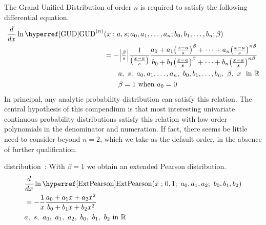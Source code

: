 

\label{sec:GUD}

The Grand Unified Distribution of order $n$ is required to satisfy the following differential equation.
\begin{align}
\label{GUD}
\frac{d}{dx} \ln  \opr{GUD}^{(n)}&(x\given a, s; a_0, a_1,\ldots,a_n;  b_0,b_1,\ldots, b_n; \beta)
\checked \\
&= -\Left|\tfrac{\beta}{s}\Right| \frac{1}{\bigl(\tfrac{x-a}{s}\bigr)} \frac{a_0  +a_1 \bigl(\tfrac{x-a}{s}\bigr)^{\beta}+\cdots +a_n \bigl(\tfrac{x-a}{s}\bigr)^{n\beta}}{b_0+ b_1 \bigl(\tfrac{x-a}{s}\bigr)^{\beta}+\cdots+b_n\bigl(\tfrac{x-a}{s}\bigr)^{n\beta}  } 
\notag
\checked
\\
& \qquad  a,\ s,\  a_0,a_1,\ldots,a_n,\ b_0,b_1, \ldots, b_n,\ \beta,\ x\  \text{ in } \mathbb{R} 
\checked
\notag
\\ \notag
& \qquad \beta = 1 \text{ when } a_0 =0
\checked
\end{align}
In principal, any analytic probability distribution can satisfy this relation.
The central hypothesis of this compendium is that most interesting univariate continuous probability distributions satisfy this relation with low order polynomials in the denominator and numeration. If fact, there seems be little need to consider beyond $n=2$, which we take as the default order, in the absence of further qualification. 




 distribution~\cite{Roy1971}: With $\beta=1$ we obtain an extended Pearson distribution.
\begin{align}
\label{ExtPearson}
&\frac{d}{dx} \ln  \opr{ExtPearson}(x\given 0, 1;\ a_0, a_1, a_2;\ b_0, b_1, b_2) \checked \\
\notag
&= - \frac{1}{x} \frac{a_0 +a_1 x+ a_2 x^2}{b_0+ b_1 x+  b_2 x^2  } \\
\notag
& a,\ s,\ a_0,\ a_1,\ a_2,\ b_0,\ b_1,\ b_2 \text{ in } \Real
\end{align}



